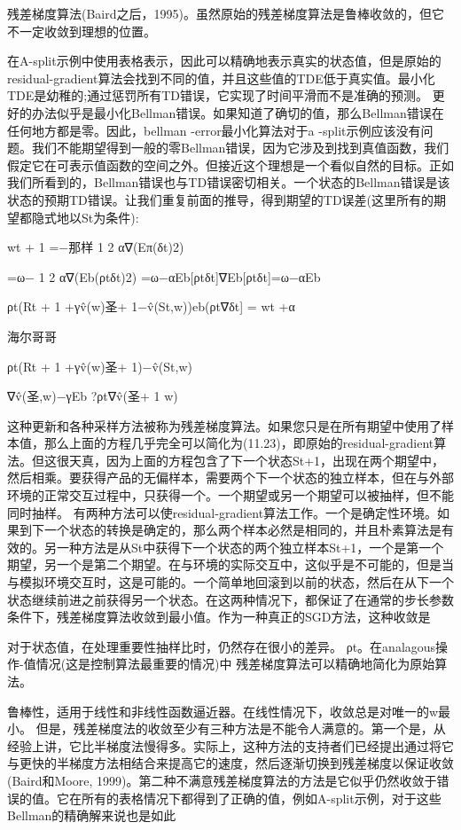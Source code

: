 残差梯度算法(Baird之后，1995)。虽然原始的残差梯度算法是鲁棒收敛的，但它不一定收敛到理想的位置。
 

在A-split示例中使用表格表示，因此可以精确地表示真实的状态值，但是原始的residual-gradient算法会找到不同的值，并且这些值的TDE低于真实值。最小化TDE是幼稚的;通过惩罚所有TD错误，它实现了时间平滑而不是准确的预测。
更好的办法似乎是最小化Bellman错误。如果知道了确切的值，那么Bellman错误在任何地方都是零。因此，bellman -error最小化算法对于a -split示例应该没有问题。我们不能期望得到一般的零Bellman错误，因为它涉及到找到真值函数，我们假定它在可表示值函数的空间之外。但接近这个理想是一个看似自然的目标。正如我们所看到的，Bellman错误也与TD错误密切相关。一个状态的Bellman错误是该状态的预期TD错误。让我们重复前面的推导，得到期望的TD误差(这里所有的期望都隐式地以St为条件):


wt + 1 =−那样
1 2
α∇(Eπ(δt)2)

=ω−
1 2
α∇(Eb(ρtδt)2)
=ω−αEb[ρtδt]∇Eb[ρtδt]=ω−αEb

ρt(Rt + 1 +γv̂(w)圣+ 1−v̂(St,w))eb(ρt∇δt]
= wt +α

海尔哥哥

ρt(Rt + 1 +γv̂(w)圣+ 1)−v̂(St,w)

∇v̂(圣,w)−γEb ?ρt∇v̂(圣+ 1 w)


这种更新和各种采样方法被称为残差梯度算法。如果您只是在所有期望中使用了样本值，那么上面的方程几乎完全可以简化为(11.23)，即原始的residual-gradient算法。但这很天真，因为上面的方程包含了下一个状态St+1，出现在两个期望中，然后相乘。要获得产品的无偏样本，需要两个下一个状态的独立样本，但在与外部环境的正常交互过程中，只获得一个。一个期望或另一个期望可以被抽样，但不能同时抽样。
有两种方法可以使residual-gradient算法工作。一个是确定性环境。如果到下一个状态的转换是确定的，那么两个样本必然是相同的，并且朴素算法是有效的。另一种方法是从St中获得下一个状态的两个独立样本St+1，一个是第一个期望，另一个是第二个期望。在与环境的实际交互中，这似乎是不可能的，但是当与模拟环境交互时，这是可能的。一个简单地回滚到以前的状态，然后在从下一个状态继续前进之前获得另一个状态。在这两种情况下，都保证了在通常的步长参数条件下，残差梯度算法收敛到最小值。作为一种真正的SGD方法，这种收敛是

对于状态值，在处理重要性抽样比时，仍然存在很小的差异。
ρt。在analagous操作-值情况(这是控制算法最重要的情况)中
残差梯度算法可以精确地简化为原始算法。


鲁棒性，适用于线性和非线性函数逼近器。在线性情况下，收敛总是对唯一的w最小。
但是，残差梯度法的收敛至少有三种方法是不能令人满意的。第一个是，从经验上讲，它比半梯度法慢得多。实际上，这种方法的支持者们已经提出通过将它与更快的半梯度方法相结合来提高它的速度，然后逐渐切换到残差梯度以保证收敛(Baird和Moore, 1999)。第二种不满意残差梯度算法的方法是它似乎仍然收敛于错误的值。它在所有的表格情况下都得到了正确的值，例如A-split示例，对于这些Bellman的精确解来说也是如此


